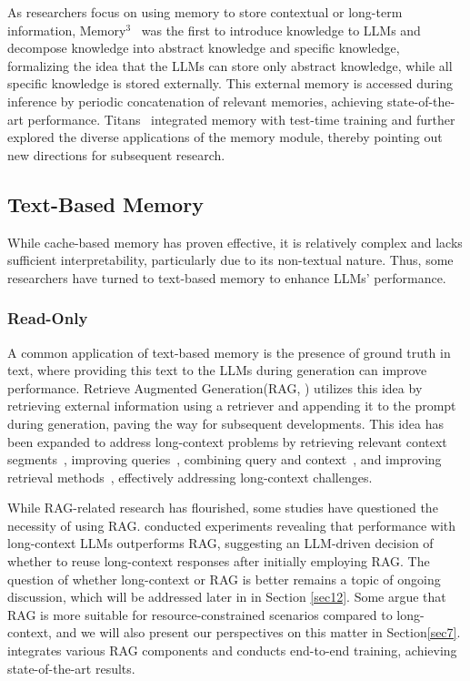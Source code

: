 As researchers focus on using memory to store contextual or long-term information, Memory$^3$~\citep{yang2024memory3} was the first to introduce knowledge to LLMs and decompose knowledge into abstract knowledge and specific knowledge, formalizing the idea that the LLMs can store only abstract knowledge, while all specific knowledge is stored externally. This external memory is accessed during inference by periodic concatenation of relevant memories, achieving state-of-the-art performance. Titans~\citep{behrouz2024titans} integrated memory with test-time training and further explored the diverse applications of the memory module, thereby pointing out new directions for subsequent research.

\subsection{Text-Based Memory}\label{sec4b}

While cache-based memory has proven effective, it is relatively complex and lacks sufficient interpretability, particularly due to its non-textual nature. Thus, some researchers have turned to text-based memory to enhance LLMs' performance.

\subsubsection{Read-Only}\label{sec4_3}

A common application of text-based memory is the presence of ground truth in text, where providing this text to the LLMs during generation can improve performance. Retrieve Augmented Generation(RAG, \citep{lewis2020retrieval}) utilizes this idea by retrieving external information using a retriever and appending it to the prompt during generation, paving the way for subsequent developments. This idea has been expanded to address long-context problems by retrieving relevant context segments~\citep{chen2023walking}, improving queries~\citep{fei2024retrieval}, combining query and context~\citep{zhao2024longrag}, and improving retrieval methods~\citep{luo2024bge, soh2024you, jiang2024longrag}, effectively addressing long-context challenges.

While RAG-related research has flourished, some studies have questioned the necessity of using RAG. \citet{li2024retrieval} conducted experiments revealing that performance with long-context LLMs outperforms RAG, suggesting an LLM-driven decision of whether to reuse long-context responses after initially employing RAG. The question of whether long-context or RAG is better remains a topic of ongoing discussion, which will be addressed later in \textbf{} in Section \ref{sec12}. Some argue that RAG is more suitable for resource-constrained scenarios compared to long-context, and we will also present our perspectives on this matter in Section\ref{sec7}. \citet{rag2_contextual_ai_2024} integrates various RAG components and conducts end-to-end training, achieving state-of-the-art results.

